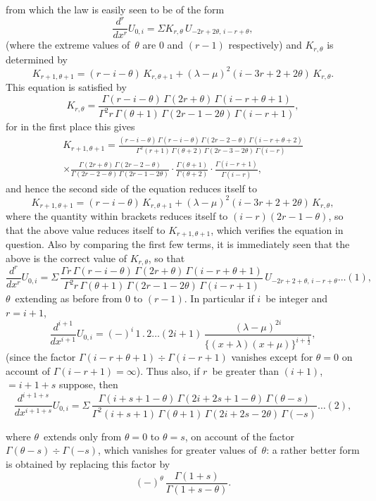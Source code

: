 \documentclass[11pt,a4paper]{article}
\begin{document}
\newpage
from which the law is easily seen to be of the form
\[
\frac{d^r}{dx^r} U_{0,i} = \Sigma K_{r,\theta} \, U_{-2r+2\theta,\,i-r+\theta},
\]
(where the extreme values of~$\theta$ are $0$ and $(r-1)$ respectively) and $K_{r,\theta}$ is determined by
\[
K_{r+1,\theta+1} = (r-i-\theta) \, K_{r,\theta+1} + (\lambda-\mu)^2 (i-3r+2+2\theta) \, K_{r,\theta}.
\]
This equation is satisfied by
\[
K_{r,\theta} = \frac{\Gamma(r-i-\theta)\,\Gamma(2r+\theta)\,\Gamma(i-r+\theta+1)}{\Gamma^2 r \, \Gamma(\theta+1) \, \Gamma(2r-1-2\theta) \, \Gamma(i-r+1)},
\]
for in the first place this gives
\begin{multline*}
K_{r+1,\theta+1} = \frac{(r-i-\theta)\,\Gamma(r-i-\theta)\,\Gamma(2r-2-\theta)\,\Gamma(i-r+\theta+2)}{\Gamma^2(r+1) \, \Gamma(\theta+2) \, \Gamma(2r-3-2\theta) \, \Gamma(i-r)} \\
\times \frac{\Gamma(2r+\theta)\,\Gamma(2r-2-\theta)}{\Gamma(2r-2-\theta)\,\Gamma(2r-1-2\theta)} \cdot \frac{\Gamma(\theta+1)}{\Gamma(\theta+2)} \cdot \frac{\Gamma(i-r+1)}{\Gamma(i-r)},
\end{multline*}
and hence the second side of the equation reduces itself to
\[
K_{r+1,\theta+1} = (r-i-\theta) \, K_{r,\theta+1} + (\lambda-\mu)^2 (i-3r+2+2\theta) \, K_{r,\theta},
\]
where the quantity within brackets reduces itself to $(i-r)(2r-1-\theta)$, so that the above value reduces itself to $K_{r+1,\theta+1}$, which verifies the equation in question. Also by comparing the first few terms, it is immediately seen that the above is the correct value of $K_{r,\theta}$, so that
\[
\frac{d^r}{dx^r} U_{0,i} = \Sigma \, \frac{\Gamma r \, \Gamma(r-i-\theta) \, \Gamma(2r+\theta) \, \Gamma(i-r+\theta+1)}{\Gamma^2 r \, \Gamma(\theta+1) \, \Gamma(2r-1-2\theta) \, \Gamma(i-r+1)} \, U_{-2r+2+\theta,\,i-r+\theta} \ldots(1),
\]
$\theta$~extending as before from $0$ to $(r-1)$. In particular if $i$~be integer and $r=i+1$,
\[
\frac{d^{i+1}}{dx^{i+1}} U_{0,i} = (-)^i \, 1 \, . \, 2 \ldots (2i+1) \, \frac{(\lambda-\mu)^{2i}}{\{(x+\lambda)(x+\mu)\}^{i+\frac{1}{2}}},
\]
(since the factor $\Gamma(i-r+\theta+1) \div \Gamma(i-r+1)$ vanishes except for $\theta=0$ on account of $\Gamma(i-r+1) = \infty$). Thus also, if $r$~be greater than $(i+1)$, $=i+1+s$ suppose, then
\[
\frac{d^{i+1+s}}{dx^{i+1+s}} U_{0,i} = \Sigma \, \frac{\Gamma(i+s+1-\theta)\,\Gamma(2i+2s+1-\theta)\,\Gamma(\theta-s)}{\Gamma^2(i+s+1)\,\Gamma(\theta+1)\,\Gamma(2i+2s-2\theta)\,\Gamma(-s)} \ldots(2),
\]

\newpage
where $\theta$~extends only from $\theta=0$ to $\theta=s$, on account of the factor $\Gamma(\theta-s) \div \Gamma(-s)$, which vanishes for greater values of~$\theta$: a rather better form is obtained by replacing this factor by
\[
(-)^\theta \, \frac{\Gamma(1+s)}{\Gamma(1+s-\theta)}.
\]
\end{document}
